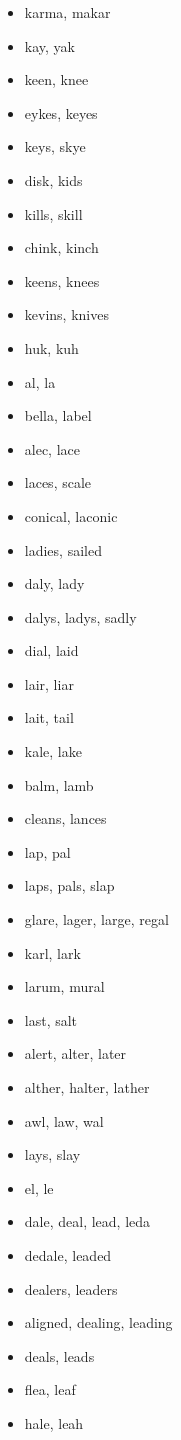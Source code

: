 \documentclass[a4wide,11pt]{report}
\begin{document}
\begin{itemize}
  \item karma, makar
  \item kay, yak
  \item keen, knee
  \item eykes, keyes
  \item keys, skye
  \item disk, kids
  \item kills, skill
  \item chink, kinch
  \item keens, knees
  \item kevins, knives
  \item huk, kuh
  \item al, la
  \item bella, label
  \item alec, lace
  \item laces, scale
  \item conical, laconic
  \item ladies, sailed
  \item daly, lady
  \item dalys, ladys, sadly
  \item dial, laid
  \item lair, liar
  \item lait, tail
  \item kale, lake
  \item balm, lamb
  \item cleans, lances
  \item lap, pal
  \item laps, pals, slap
  \item glare, lager, large, regal
  \item karl, lark
  \item larum, mural
  \item last, salt
  \item alert, alter, later
  \item alther, halter, lather
  \item awl, law, wal
  \item lays, slay
  \item el, le
  \item dale, deal, lead, leda
  \item dedale, leaded
  \item dealers, leaders
  \item aligned, dealing, leading
  \item deals, leads
  \item flea, leaf
  \item hale, leah

\end{itemize}
\end{document}
